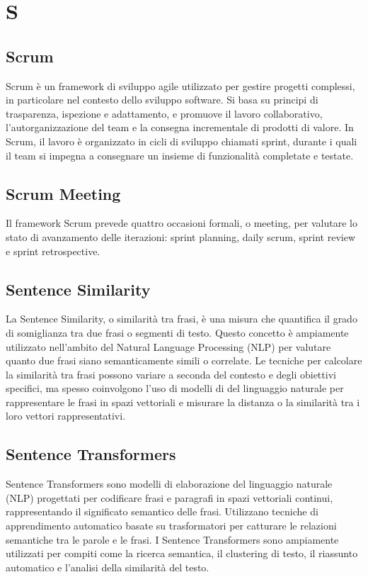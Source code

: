 \section{S}

\vspace{2em}
\subsection*{Scrum}
Scrum è un framework di sviluppo agile utilizzato per gestire progetti complessi, in particolare nel contesto dello sviluppo software. Si basa su principi di trasparenza, ispezione e adattamento, e promuove il lavoro collaborativo, l'autorganizzazione del team e la consegna incrementale di prodotti di valore. In Scrum, il lavoro è organizzato in cicli di sviluppo chiamati sprint, durante i quali il team si impegna a consegnare un insieme di funzionalità completate e testate.

\vspace{2em}
\subsection*{Scrum Meeting}
Il framework Scrum prevede quattro occasioni formali, o meeting, per valutare lo stato di avanzamento delle iterazioni: sprint planning, daily scrum, sprint review e sprint retrospective.

\vspace{2em}
\subsection*{Sentence Similarity}
La Sentence Similarity, o similarità tra frasi, è una misura che quantifica il grado di somiglianza tra due frasi o segmenti di testo. Questo concetto è ampiamente utilizzato nell'ambito del Natural Language Processing (NLP) per valutare quanto due frasi siano semanticamente simili o correlate. Le tecniche per calcolare la similarità tra frasi possono variare a seconda del contesto e degli obiettivi specifici, ma spesso coinvolgono l'uso di modelli di  del linguaggio naturale per rappresentare le frasi in spazi vettoriali e misurare la distanza o la similarità tra i loro vettori rappresentativi.

\vspace{2em}
\subsection*{Sentence Transformers}
Sentence Transformers sono modelli di elaborazione del linguaggio naturale (NLP) progettati per codificare frasi e paragrafi in spazi vettoriali continui, rappresentando il significato semantico delle frasi. Utilizzano tecniche di apprendimento automatico basate su trasformatori per catturare le relazioni semantiche tra le parole e le frasi. I Sentence Transformers sono ampiamente utilizzati per compiti come la ricerca semantica, il clustering di testo, il riassunto automatico e l'analisi della similarità del testo.

